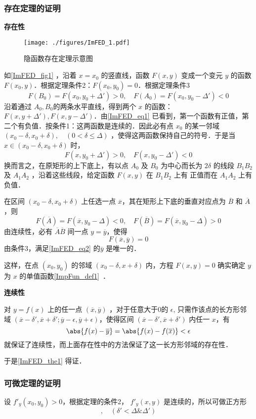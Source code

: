 \subsubsection{存在定理的证明}
\textbf{存在性}
\begin{figure}[ht]
\centering
\texttt{[image: ./figures/ImFED\_1.pdf]}
\caption{隐函数存在定理示意图} \label{ImFED_fig1}
\end{figure}
如\autoref{ImFED_fig1} ，沿着 $x=x_0$ 的竖直线，函数 $F(x,y)$ 变成一个变元 $y$ 的函数 $F(x_0,y)$．根据定理条件2：$F(x_0,y_0)=0$．根据定理条件3
\begin{equation}\label{ImFED_eq1}
F(B_0)=F(x_0,y_0+\Delta')>0,\quad F(A_0)=F(x_0,y_0-\Delta')<0
\end{equation}
沿着通过 $A_0,B_0$的两条水平直线，得到两个 $x$ 的函数：$F(x,y+\Delta'),F(x,y-\Delta')$．由\autoref{ImFED_eq1} 已看到，第一个函数有正值，第二个有负值．按条件1：这两函数是连续的．因此必有点 $x_0$ 的某一邻域 $(x_0-\delta,x_0+\delta),\quad(0<\delta\leq\Delta)$ ，使得这两函数保持自己的符号．于是当 $x\in(x_0-\delta,x_0+\delta)$ 时，
\begin{equation}
F(x,y_0+\Delta')>0,\quad F(x,y_0-\Delta')<0
\end{equation}
换而言之，在原矩形的上下底上，有以点 $A_0$ 及 $B_0$ 为中心而长为 $2\delta$ 的线段  $B_1B_2$ 及 $A_1A_2$ ，沿着这些线段，给定函数 $F(x,y)$ 在 $B_1B_2$ 上有 正值而在 $A_1A_2$ 上有负值．

在区间 $(x_0-\delta,x_0+\delta)$ 上任选一点 $\overline{x}$，其在矩形上下底的垂直对应点为 $\overline{B}$ 和 $\overline{A}$，则
\begin{equation}
F(\overline{A})=F(\overline{x},y_0-\Delta)<0,\quad F(\overline{B})=F(\overline{x},y_0-\Delta)>0
\end{equation}
由连续性，必有 $\overline{A}\overline{B}$ 间一点 $y=\overline{y}$，使得
\begin{equation}\label{ImFED_eq2}
F(\overline{x},\overline{y})=0
\end{equation}
由条件3，满足\autoref{ImFED_eq2} 的$\overline{y}$ 是唯一的．

这样，在点 $(x_0,y_0)$ 的邻域 $(x_0-\delta,x+\delta)$ 内，方程 $F(x,y)=0$ 确实确定 $y$ 为 $x$ 的单值函数\autoref{ImpFun_def1}~．

\textbf{连续性}

对 $y=f(x)$ 上的任一点 $(\overline{x},\overline{y})$ ，对于任意大于0的 $\epsilon$, 只需作该点的长方形邻域 $(\overline{x}-\delta',\overline{x}+\delta';\overline{y}-\epsilon,\overline{y}+\epsilon)$，使得区间 $(\overline{x}-\delta',\overline{x}+\delta')$ 内任一 $x$，有
\begin{equation}
\abs{f(x)-\overline{y}}=\abs{f(x)-f(\overline{x})}<\epsilon
\end{equation}
就保证了连续性，而上面存在性中的方法保证了这一长方形邻域的存在性．

于是\autoref{ImFED_the1} 得证．
\subsubsection{可微定理的证明}
设 $f'_y(x_0,y_0)>0$，根据定理的条件2， $f'_y(x,y)$ 是连续的，所以可做正方形
\begin{equation}
[x_0-\delta',x_0+\delta';y_0-\delta',y_0+\delta'],\quad(\delta'<\Delta \&\Delta') 
\end{equation}
